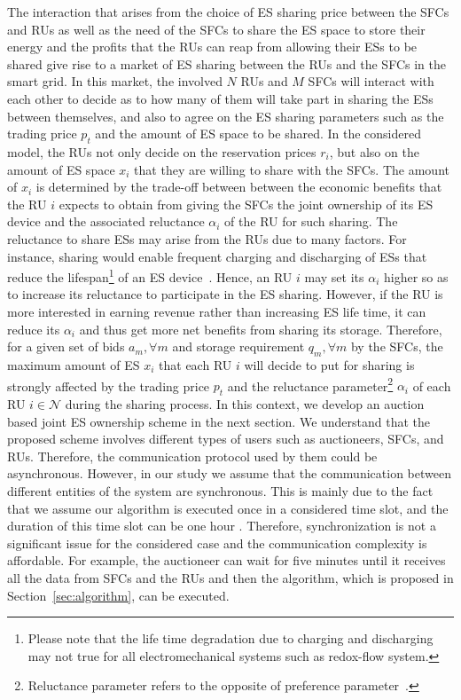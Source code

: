 \documentclass[journal,10pt]{IEEEtran}
\begin{document}
The interaction that arises from the choice of ES sharing price between the SFCs and RUs as well as the need of the SFCs to share the ES space to store their energy and the profits that the RUs can reap from allowing their ESs to be shared give rise to a market of ES sharing between the RUs and the SFCs in the smart grid. In this market, the involved $N$ RUs and $M$ SFCs will interact with each other to decide as to how many of them will take part in sharing the ESs between themselves, and also to agree on the ES sharing parameters such as the trading price $p_t$ and the amount of ES space to be shared. In the considered model, the RUs not only decide on the reservation prices $r_i$, but also on the amount of ES space $x_i$ that they are willing to share with the SFCs. The amount of $x_i$ is determined by the trade-off between between the economic benefits that the RU $i$ expects to obtain from giving the SFCs the joint ownership of its ES device and the associated reluctance $\alpha_i$ of the RU for such sharing. The reluctance to share ESs may arise from the RUs due to many factors. For instance, sharing would enable frequent charging and discharging of ESs that reduce the lifespan\footnote{Please note that the life time degradation due to charging and discharging may not true for all electromechanical systems such as redox-flow system.} of an ES device~\cite{Bradley-RSER:2009}. Hence, an RU $i$ may set its $\alpha_i$ higher so as to increase its reluctance to participate in the ES sharing. However, if the RU is more interested in earning revenue rather than increasing ES life time, it can reduce its $\alpha_i$ and thus get more net benefits from sharing its storage. Therefore, for a given set of bids $a_m,\forall m$ and storage requirement $q_m,\forall m$ by the SFCs, the maximum amount of ES $x_i$ that each RU $i$ will decide to put for sharing is strongly affected by the trading price $p_t$ and the reluctance parameter\footnote{Reluctance parameter refers to the opposite of preference parameter~\cite{Wayes-J-TSG:2012}.} $\alpha_i$ of each RU $i\in\mathcal{N}$ during the sharing process. In this context, we develop an auction based joint ES ownership scheme in the next section. We understand that the proposed scheme involves different types of users such as auctioneers, SFCs, and RUs. Therefore, the communication protocol used by them could be asynchronous. However, in our study we assume that the communication between different entities of the system are synchronous. This is mainly due to the fact that we assume our algorithm is executed once in a considered time slot, and the duration of this time slot can be one hour \cite{Derin:2010}. Therefore, synchronization is not a significant issue for the considered case and the communication complexity is affordable. For example, the auctioneer can wait for five minutes until it receives all the data from SFCs and the RUs and then the algorithm, which is proposed in Section~\ref{sec:algorithm}, can be executed.
\end{document}
